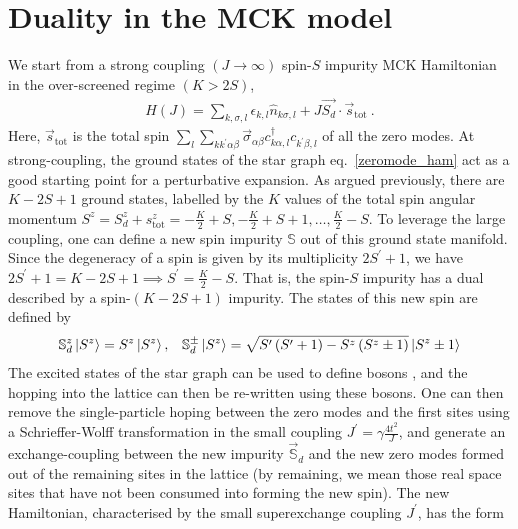 \documentclass[12pt]{revtex4-2}
\begin{document}
\section{Duality in the MCK model}
We start from a strong coupling \((J \to \infty)\) spin-\(S\) impurity MCK Hamiltonian in the over-screened regime \(\left( K > 2S \right) \),
\begin{equation}\begin{aligned}
	\label{strong_ham}
	H(J) = \sum_{k,\sigma,l}\epsilon_{k,l} \hat n_{k\sigma,l} + J \vec{S_d}\cdot\vec{s}_\text{tot}~.
\end{aligned}\end{equation}
Here, \(\vec s_\text{tot}\) is the total spin \(\sum_l \sum_{kk^\prime \alpha\beta} \vec \sigma_{\alpha\beta}c^\dagger_{k\alpha,l}c_{k^\prime\beta,l}\) of all the zero modes. At strong-coupling, the ground states of the star graph eq.~\ref{zeromode_ham} act as a good starting point for a perturbative expansion. As argued previously, there are \(K-2S+1\) ground states, labelled by the \(K\) values of the total spin angular momentum \(S^z = S_d^z + s_\text{tot}^z = -\frac{K}{2} + S, -\frac{K}{2} + S + 1, \ldots, \frac{K}{2} - S\). To leverage the large coupling, one can define a new spin impurity \(\mathbb{S}\) out of this ground state manifold. Since the degeneracy of a spin is given by its multiplicity \(2S^\prime + 1\), we have \(2S^\prime + 1 = K-2S+1 \implies S^\prime = \frac{K}{2} - S\). That is, the spin-\(S\) impurity has a dual described by a spin-\((K-2S+1)\) impurity. The states of this new spin are defined by
\begin{equation}\begin{aligned}
	\mathbb{S}_d^z \ket{S^z} = S^z \ket{S^z}, &&\mathbb{S}_d^\pm \ket{S^z} = \sqrt{S^\prime\left( S^\prime + 1 \right) - S^z\left( S^z \pm 1\right)} \ket{S^z \pm 1}
\end{aligned}\end{equation}
The excited states of the star graph can be used to define bosons \cite{kroha_kolf_2007}, and the hopping into the lattice can then be re-written using these bosons. One can then remove the single-particle hoping between the zero modes and the first sites using a Schrieffer-Wolff transformation in the small coupling \(J^\prime = \gamma \frac{4t^2}{J}\), and generate an exchange-coupling between the new impurity \(\vec {\mathbb{S}}_d\) and the new zero modes formed out of the remaining sites in the lattice \cite{kroha_kolf_2007} (by remaining, we mean those real space sites that have not been consumed into forming the new spin). The new Hamiltonian, characterised by the small superexchange  coupling \(J^\prime\), has the form
\end{document}
